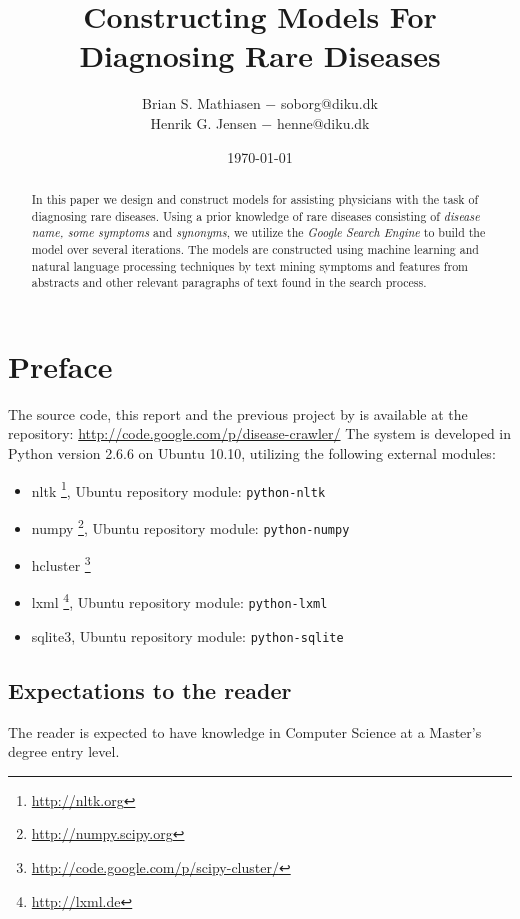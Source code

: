 \documentclass[10pt,letterpaper,final]{article}
\title{Constructing Models For Diagnosing Rare Diseases}
\author{Brian S. Mathiasen $-$ soborg@diku.dk \\
        Henrik G. Jensen $-$ henne@diku.dk\\
}
\date{\today} %
\begin{document}
\maketitle
\listoffixmes


\begin{abstract}
In this paper we design and construct models for assisting physicians
with the task of diagnosing rare diseases. Using a prior knowledge of
rare diseases consisting of \textit{disease name, some symptoms} and
\textit{synonyms}, we utilize the \textit{Google Search Engine} to build
the model over several iterations. The models are constructed using
machine learning and natural language processing techniques by text
mining symptoms and features from abstracts and other relevant
paragraphs of text found in the search process.

\end{abstract}

\section{Preface}
The source code, this report and the previous project by
\cite{jensenandersen} is available at the repository:
\url{http://code.google.com/p/disease-crawler/}
The system is developed in Python version 2.6.6 on Ubuntu 10.10,
utilizing the following external modules:
\begin{itemize}
\item nltk \footnote{\url{http://nltk.org}}, Ubuntu repository module: \texttt{python-nltk}
\item numpy \footnote{\url{http://numpy.scipy.org}}, Ubuntu repository module: \texttt{python-numpy}
\item hcluster \footnote{\url{http://code.google.com/p/scipy-cluster/}}
\item lxml \footnote{\url{http://lxml.de}}, Ubuntu repository module: \texttt{python-lxml}
\item sqlite3, Ubuntu repository module: \texttt{python-sqlite}
\end{itemize}

\subsection{Expectations to the reader}
The reader is expected to have knowledge in Computer Science at a
Master's degree entry level.
\end{document}
